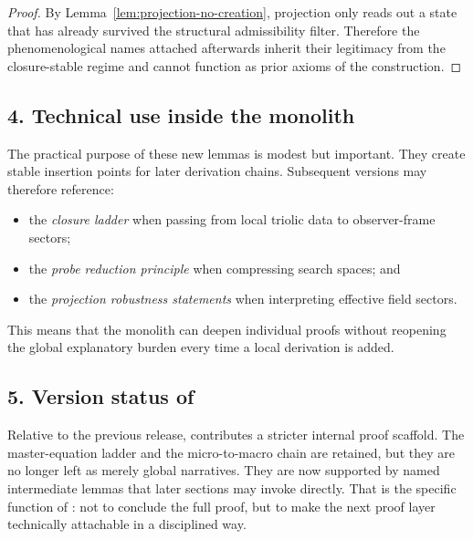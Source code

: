 \begin{proof}
By Lemma~\ref{lem:projection-no-creation}, projection only reads out a state
that has already survived the structural admissibility filter. Therefore the
phenomenological names attached afterwards inherit their legitimacy from the
closure-stable regime and cannot function as prior axioms of the construction.
\end{proof}

\subsection*{4. Technical use inside the monolith}
The practical purpose of these new lemmas is modest but important. They create
stable insertion points for later derivation chains. Subsequent versions may
therefore reference:
\begin{itemize}[leftmargin=2em]
 \item the \emph{closure ladder} when passing from local triolic data to
 observer-frame sectors;
 \item the \emph{probe reduction principle} when compressing search spaces; and
 \item the \emph{projection robustness statements} when interpreting effective
 field sectors.
\end{itemize}
This means that the monolith can deepen individual proofs without reopening the
global explanatory burden every time a local derivation is added.

\subsection*{5. Version status of }
Relative to the previous release,  contributes a stricter internal
proof scaffold. The master-equation ladder and the micro-to-macro chain are
retained, but they are no longer left as merely global narratives. They are now
supported by named intermediate lemmas that later sections may invoke directly.
That is the specific function of : not to conclude the full proof,
but to make the next proof layer technically attachable in a disciplined way.


